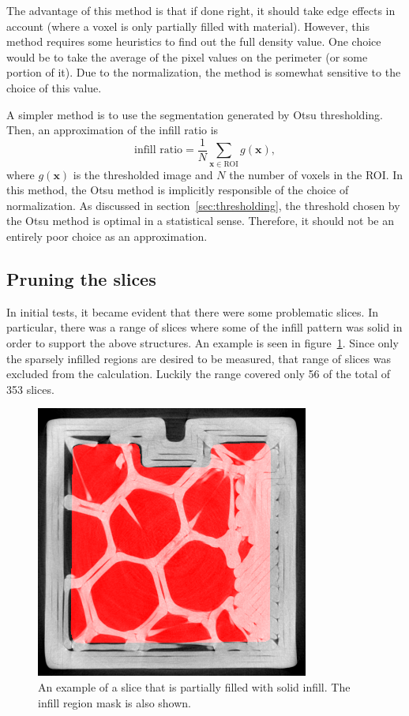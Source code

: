 \documentclass[a4paper,twoside,12pt]{article}
\begin{document}
The advantage of this method is that if done right, it should take edge effects in account (where a voxel is only partially filled with material). However, this method requires some heuristics to find out the full density value. One choice would be to take the average of the pixel values on the perimeter (or some portion of it). Due to the normalization, the method is somewhat sensitive to the choice of this value.

A simpler method is to use the segmentation generated by Otsu thresholding. Then, an approximation of the infill ratio is
\begin{equation}
    \label{eq:infill_ratio}
    \text{infill ratio} = \frac{1}{N} \sum\limits_{\mathbf{x} \in \text{ROI}} g(\mathbf{x}),
\end{equation}
where $g(\mathbf{x})$ is the thresholded image and $N$ the number of voxels in the ROI. In this method, the Otsu method is implicitly responsible of the choice of normalization. As discussed in section~\ref{sec:thresholding}, the threshold chosen by the Otsu method is optimal in a statistical sense. Therefore, it should not be an entirely poor choice as an approximation.

\subsection{Pruning the slices}
In initial tests, it became evident that there were some problematic slices. In particular, there was a range of slices where some of the infill pattern was solid in order to support the above structures. An example is seen in figure~\ref{fig:solid_infill}. Since only the sparsely infilled regions are desired to be measured, that range of slices was excluded from the calculation. Luckily the range covered only 56 of the total of 353 slices.
\begin{figure}
    \centering
    \includegraphics[width=0.8\textwidth]{images/eroded_71.png}
    \caption{An example of a slice that is partially filled with solid infill. The infill region mask is also shown.}
    \label{fig:solid_infill}
\end{figure}
\end{document}
